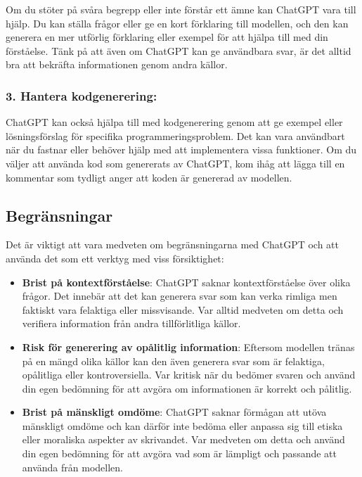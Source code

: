 Om du stöter på svåra begrepp eller inte förstår ett ämne kan ChatGPT
vara till hjälp. Du kan ställa frågor eller ge en kort förklaring till
modellen, och den kan generera en mer utförlig förklaring eller exempel
för att hjälpa till med din förståelse. Tänk på att även om ChatGPT kan
ge användbara svar, är det alltid bra att bekräfta informationen genom
andra källor.

\hypertarget{hantera-kodgenerering}{%
\subsubsection{3. Hantera kodgenerering:}\label{hantera-kodgenerering}}

ChatGPT kan också hjälpa till med kodgenerering genom att ge exempel
eller lösningsförslag för specifika programmeringsproblem. Det kan vara
användbart när du fastnar eller behöver hjälp med att implementera vissa
funktioner. Om du väljer att använda kod som genererats av ChatGPT, kom
ihåg att lägga till en kommentar som tydligt anger att koden är
genererad av modellen.

\hypertarget{begruxe4nsningar}{%
\subsection{Begränsningar}\label{begruxe4nsningar}}

Det är viktigt att vara medveten om begränsningarna med ChatGPT och att
använda det som ett verktyg med viss försiktighet:

\begin{itemize}
\item
  \textbf{Brist på kontextförståelse}: ChatGPT saknar kontextförståelse
  över olika frågor. Det innebär att det kan generera svar som kan verka
  rimliga men faktiskt vara felaktiga eller missvisande. Var alltid
  medveten om detta och verifiera information från andra tillförlitliga
  källor.
\item
  \textbf{Risk för generering av opålitlig information}: Eftersom
  modellen tränas på en mängd olika källor kan den även generera svar
  som är felaktiga, opålitliga eller kontroversiella. Var kritisk när du
  bedömer svaren och använd din egen bedömning för att avgöra om
  informationen är korrekt och pålitlig.
\item
  \textbf{Brist på mänskligt omdöme}: ChatGPT saknar förmågan att utöva
  mänskligt omdöme och kan därför inte bedöma eller anpassa sig till
  etiska eller moraliska aspekter av skrivandet. Var medveten om detta
  och använd din egen bedömning för att avgöra vad som är lämpligt och
  passande att använda från modellen.
\end{itemize}

